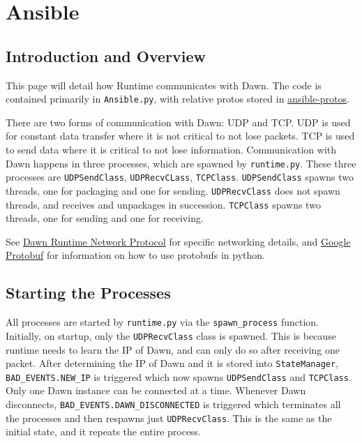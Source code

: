 \documentclass[12pt]{book}
\begin{document}
\section{Ansible}
\subsection{Introduction and Overview}\label{introduction-and-overview}

This page will detail how Runtime communicates with Dawn. The code is
contained primarily in \texttt{Ansible.py}, with relative protos stored
in
\href{https://github.com/pioneers/PieCentral/tree/master/ansible-protos}{ansible-protos}.

There are two forms of communication with Dawn: UDP and TCP. UDP is used
for constant data transfer where it is not critical to not lose packets.
TCP is used to send data where it is critical to not lose information.
Communication with Dawn happens in three processes, which are spawned by
\texttt{runtime.py}. These three processes are \texttt{UDPSendClass},
\texttt{UDPRecvCLass}, \texttt{TCPClass}. \texttt{UDPSendClass} spawns
two threads, one for packaging and one for sending.
\texttt{UDPRecvClass} does not spawn threads, and receives and
unpackages in succession. \texttt{TCPClass} spawns two threads, one for
sending and one for receiving.

See \href{https://github.com/pioneers/PieCentral/wiki/Dawn-Runtime-Network-Protocol}{Dawn Runtime Network Protocol}
for specific networking details, and
\href{https://developers.google.com/protocol-buffers/docs/pythontutorial}{Google
Protobuf} for information on how to use protobufs in python.

\subsection{Starting the Processes}\label{starting-the-processes}

All processes are started by \texttt{runtime.py} via the
\texttt{spawn\_process} function. Initially, on startup, only the
\texttt{UDPRecvClass} class is spawned. This is because runtime needs to
learn the IP of Dawn, and can only do so after receiving one packet.
After determining the IP of Dawn and it is stored into
\texttt{StateManager}, \texttt{BAD\_EVENTS.NEW\_IP} is triggered which
now spawns \texttt{UDPSendClass} and \texttt{TCPClass}. Only one Dawn
instance can be connected at a time. Whenever Dawn disconnects,
\texttt{BAD\_EVENTS.DAWN\_DISCONNECTED} is triggered which terminates
all the processes and then respawns just \texttt{UDPRecvClass}. This is
the same as the initial state, and it repeats the entire process.
\end{document}
